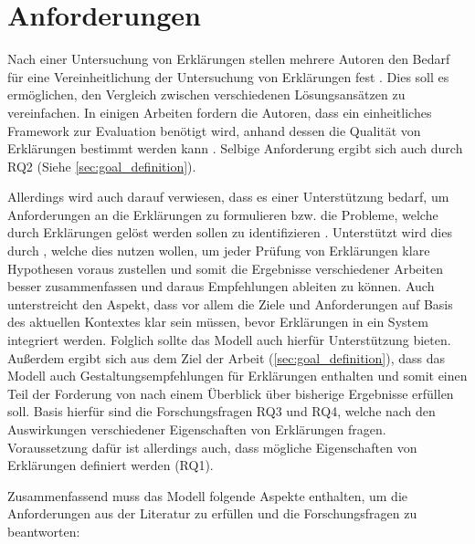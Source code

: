 \section{Anforderungen}

Nach einer Untersuchung von Erklärungen stellen mehrere Autoren den Bedarf für eine Vereinheitlichung der Untersuchung von Erklärungen fest \cite{cirqueira_scenario-based_2020,zahedi_towards_2019, nunes_systematic_2017, martin_evaluating_2021}. Dies soll es ermöglichen, den Vergleich zwischen verschiedenen Lösungsansätzen zu vereinfachen. In einigen Arbeiten fordern die Autoren, dass ein einheitliches Framework zur Evaluation benötigt wird, anhand dessen die Qualität von Erklärungen bestimmt werden kann \cite{nunes_systematic_2017,sokol_explainability_2020,chari_explanation_2020}. Selbige Anforderung ergibt sich auch durch RQ2 (Siehe \autoref{sec:goal_definition}).

Allerdings wird auch darauf verwiesen, dass es einer Unterstützung bedarf, um Anforderungen an die Erklärungen zu formulieren bzw. die Probleme, welche durch Erklärungen gelöst werden sollen zu identifizieren \cite{chazette_end-users_nodate, doshi2017towards}. Unterstützt wird dies durch \citeauthor{waa_evaluating_2021}, welche dies nutzen wollen, um jeder Prüfung von Erklärungen klare Hypothesen voraus zustellen und somit die Ergebnisse verschiedener Arbeiten besser zusammenfassen und daraus Empfehlungen ableiten zu können. Auch \citeauthor{kohl_explainability_2019} unterstreicht den Aspekt, dass vor allem die Ziele und Anforderungen auf Basis des aktuellen Kontextes klar sein müssen, bevor Erklärungen in ein System integriert werden. Folglich sollte das Modell auch hierfür Unterstützung bieten. Außerdem ergibt sich aus dem Ziel der Arbeit (\autoref{sec:goal_definition}), dass das Modell auch Gestaltungsempfehlungen für Erklärungen enthalten und somit einen Teil der Forderung von \citeauthor{waa_evaluating_2021} nach einem Überblick über bisherige Ergebnisse erfüllen soll. Basis hierfür sind die Forschungsfragen RQ3 und RQ4, welche nach den Auswirkungen verschiedener Eigenschaften von Erklärungen fragen. Voraussetzung dafür ist allerdings auch, dass mögliche Eigenschaften von Erklärungen definiert werden (RQ1).

\smallskip

Zusammenfassend muss das Modell folgende Aspekte enthalten, um die Anforderungen aus der Literatur zu erfüllen und die Forschungsfragen zu beantworten:

